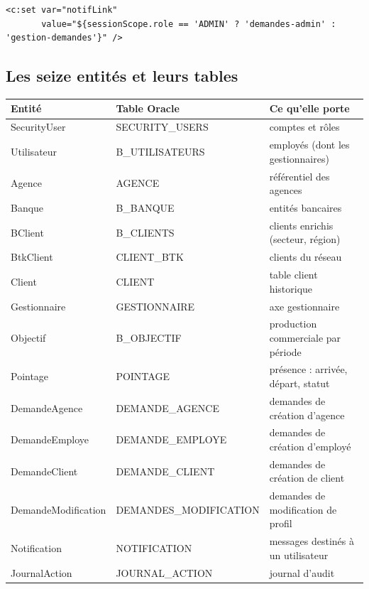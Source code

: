 \begin{lstlisting}[style=jsp]
<c:set var="notifLink"
       value="${sessionScope.role == 'ADMIN' ? 'demandes-admin' : 'gestion-demandes'}" />
\end{lstlisting}

\subsection{Les seize entités et leurs tables}

\noindent\begin{tabularx}{\textwidth}{|>{\ttfamily}L{4.3cm}|>{\ttfamily}L{4.3cm}|X|}
\hline
\textmd{\textbf{Entité}} & \textmd{\textbf{Table Oracle}} & \textbf{Ce qu'elle porte}\\
\hline
SecurityUser & SECURITY\_USERS & comptes et rôles\\
\hline
Utilisateur & B\_UTILISATEURS & employés (dont les gestionnaires)\\
\hline
Agence & AGENCE & référentiel des agences\\
\hline
Banque & B\_BANQUE & entités bancaires\\
\hline
BClient & B\_CLIENTS & clients enrichis (secteur, région)\\
\hline
BtkClient & CLIENT\_BTK & clients du réseau\\
\hline
Client & CLIENT & table client historique\\
\hline
Gestionnaire & GESTIONNAIRE & axe gestionnaire\\
\hline
Objectif & B\_OBJECTIF & production commerciale par période\\
\hline
Pointage & POINTAGE & présence : arrivée, départ, statut\\
\hline
DemandeAgence & DEMANDE\_AGENCE & demandes de création d'agence\\
\hline
DemandeEmploye & DEMANDE\_EMPLOYE & demandes de création d'employé\\
\hline
DemandeClient & DEMANDE\_CLIENT & demandes de création de client\\
\hline
DemandeModification & DEMANDES\_MODIFICATION & demandes de modification de profil\\
\hline
Notification & NOTIFICATION & messages destinés à un utilisateur\\
\hline
JournalAction & JOURNAL\_ACTION & journal d'audit\\
\hline
\end{tabularx}
